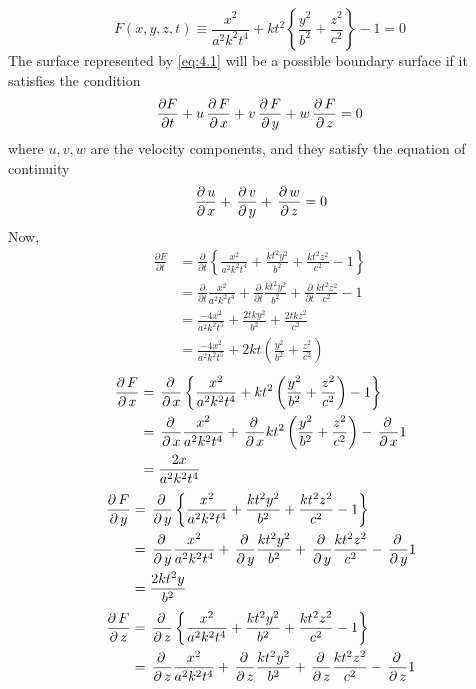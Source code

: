 \documentclass[12pt]{article}
\begin{document}
\begin{soln}
    \begin{equation}
        F(x,y,z,t)\equiv \frac{x^2}{a^2k^2t^4}+kt^2\left\{ \frac{y^2}{b^2} + \frac{z^2}{c^2} \right\}-1=0 \label{eq:4.1}
    \end{equation}
    The surface represented by \eqref{eq:4.1} will be a possible boundary surface if it satisfies the condition
    \begin{equation}
        \frac{\partial F}{\partial t}+u \,\frac{\partial\, F}{\partial\, x}+v\,\frac{\partial\, F}{\partial\, y}+w\,\frac{\partial\, F}{\partial\, z}=0\label{eq:4.2}
    \end{equation}
    where $ u,v,w $ are the velocity components, and they satisfy the equation of continuity
    \[
        \,\frac{\partial\, u}{\partial\, x}+\,\frac{\partial\, v}{\partial\, y}+\,\frac{\partial\, w}{\partial\, z}=0
    \]
    Now,
    \begin{align*}
        \frac{\partial F}{\partial t}&=\frac{\partial}{\partial t}\left\{ \frac{x^2}{a^2k^2t^4}+\frac{kt^2y^2}{b^2} + \frac{kt^2z^2}{c^2}-1 \right\}\\
        &=\frac{\partial}{\partial t}\frac{x^2}{a^2k^2t^4}+\frac{\partial}{\partial t}\frac{kt^2y^2}{b^2} +\frac{\partial}{\partial t} \frac{kt^2z^2}{c^2}-1 \\
        &=\frac{-4x^2}{a^2k^2t^5}+\frac{2tky^2}{b^2}+\frac{2tkz^2}{c^2}\\
        &=\frac{-4x^2}{a^2k^2t^5}+2kt\left(\frac{y^2}{b^2}+\frac{z^2}{c^2}\right)
    \end{align*}
    \begin{align*}
        \,\frac{\partial\, F}{\partial\, x}&=\,\frac{\partial\, }{\partial\, x}\left\{ \frac{x^2}{a^2k^2t^4}+kt^2\left( \frac{y^2}{b^2} + \frac{z^2}{c^2} \right)-1 \right\}\\
        &=\,\frac{\partial\, }{\partial\, x}\frac{x^2}{a^2k^2t^4}+\,\frac{\partial\, }{\partial\, x}kt^2\left( \frac{y^2}{b^2} + \frac{z^2}{c^2} \right)-\,\frac{\partial\, }{\partial\, x}1 \\
        &=\frac{2x}{a^2k^2t^4}
    \end{align*}
    \begin{align*}
        \,\frac{\partial\, F}{\partial\, y}&=\,\frac{\partial\, }{\partial\, y}\left\{ \frac{x^2}{a^2k^2t^4}+\frac{kt^2y^2}{b^2} + \frac{kt^2z^2}{c^2}-1 \right\}\\
        &=\,\frac{\partial\, }{\partial\, y}\frac{x^2}{a^2k^2t^4}+\,\frac{\partial\, }{\partial\, y}\frac{kt^2y^2}{b^2} +\,\frac{\partial\, }{\partial\, y} \frac{kt^2z^2}{c^2}-\,\frac{\partial\, }{\partial\, y}1\\
        &=\frac{2kt^2y}{b^2}
    \end{align*}
    \begin{align*}
        \pardz{F}&=\pardz{}\left\{ \frac{x^2}{a^2k^2t^4}+\frac{kt^2y^2}{b^2} + \frac{kt^2z^2}{c^2}-1 \right\}\\
        &=\pardz{}\frac{x^2}{a^2k^2t^4}+\pardz{}\frac{kt^2y^2}{b^2} +\pardz{} \frac{kt^2z^2}{c^2}-\pardz{}1\\

\end{align*}
\end{soln}
\end{document}
